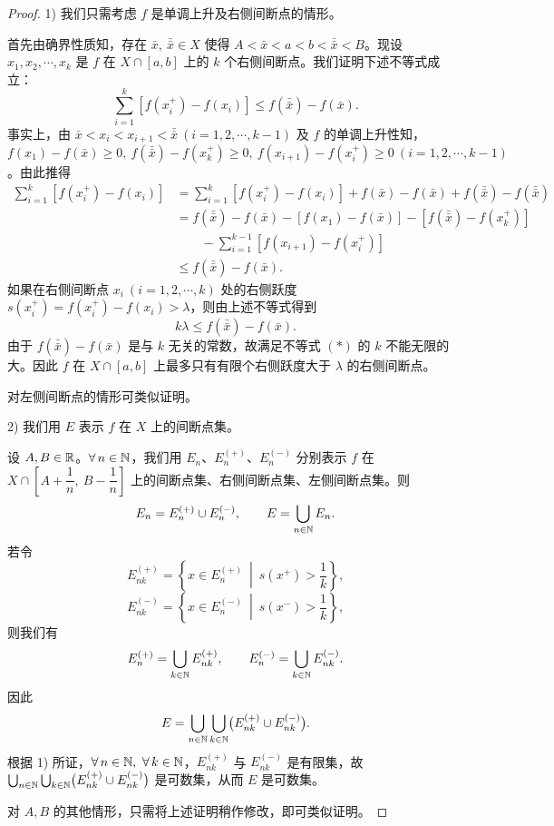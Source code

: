 \begin{proof}

	1) 我们只需考虑 \(f\) 是单调上升及右侧间断点的情形。

	首先由确界性质知，存在 \(\bar x,\ \bar{\bar x}\in X\) 使得 \(A<\bar x<a<b<\bar{\bar x}<B\)。现设 \(x_1,x_2,\cdots,x_k\) 是 \(f\) 在 \(X\cap[a,b]\) 上的 \(k\) 个右侧间断点。我们证明下述不等式成立：
	\[
	\sum_{i=1}^k[f(x_i^+)-f(x_i)]\le f(\bar{\bar x})-f(\bar x).
	\]
	事实上，由 \(\bar x<x_i<x_{i+1}<\bar{\bar x}\ (i=1,2,\cdots,k-1)\) 及 \(f\) 的单调上升性知，\(f(x_1)-f(\bar x)\ge0,\ f(\bar{\bar x})-f(x_k^+)\ge0,\ f(x_{i+1})-f(x_i^+)\ge0\ (i=1,2,\cdots,k-1)\)。由此推得
	\[
	\begin{aligned}
	\sum_{i=1}^k[f(x_i^+)-f(x_i)]
	&=\sum_{i=1}^k[f(x_i^+)-f(x_i)]+f(\bar x)-f(\bar x)+f(\bar{\bar x})-f(\bar{\bar x})\\
	&=f(\bar{\bar x})-f(\bar x)-[f(x_1)-f(\bar x)]-[f(\bar{\bar x})-f(x_k^+)]\\
	&\qquad-\sum_{i=1}^{k-1}[f(x_{i+1})-f(x_i^+)]\\
	&\le f(\bar{\bar x})-f(\bar x).
	\end{aligned}
	\]
	如果在右侧间断点 \(x_i\ (i=1,2,\cdots,k)\) 处的右侧跃度 \(s(x_i^+)=f(x_i^+)-f(x_i)>\lambda\)，则由上述不等式得到
	\[
	k\lambda\le f(\bar{\bar x})-f(\bar x). \tag{*}
	\]
	由于 \(f(\bar{\bar x})-f(\bar x)\) 是与 \(k\) 无关的常数，故满足不等式 \((*)\) 的 \(k\) 不能无限的大。因此 \(f\) 在 \(X\cap[a,b]\) 上最多只有有限个右侧跃度大于 \(\lambda\) 的右侧间断点。

	对左侧间断点的情形可类似证明。

	2) 我们用 \(E\) 表示 \(f\) 在 \(X\) 上的间断点集。

	设 \(A,B\in\mathbb{R}\)。\(\forall\,n\in\mathbb{N}\)，我们用 \(E_n\)、\(E_n^{(+)}\)、\(E_n^{(-)}\) 分别表示 \(f\) 在 \(X\cap\left[A+\dfrac1n,\ B-\dfrac1n\right]\) 上的间断点集、右侧间断点集、左侧间断点集。则
	\[
	E_n=E_n^{(+)}\cup E_n^{(-)},\qquad E=\bigcup_{n\in\mathbb{N}}E_n.
	\]
	若令
	\[
	E_{nk}^{(+)}=\left\{x\in E_n^{(+)}\ \middle|\ s(x^+)>\frac1k\right\},
	\]
	\[
	E_{nk}^{(-)}=\left\{x\in E_n^{(-)}\ \middle|\ s(x^-)>\frac1k\right\},
	\]
	则我们有
	\[
	E_n^{(+)}=\bigcup_{k\in\mathbb{N}}E_{nk}^{(+)},\qquad E_n^{(-)}=\bigcup_{k\in\mathbb{N}}E_{nk}^{(-)}.
	\]
	因此
	\[
	E=\bigcup_{n\in\mathbb{N}}\bigcup_{k\in\mathbb{N}}\bigl(E_{nk}^{(+)}\cup E_{nk}^{(-)}\bigr).
	\]
	根据 1) 所证，\(\forall\,n\in\N,\ \forall\,k\in\N\)，\(E_{nk}^{(+)}\) 与 \(E_{nk}^{(-)}\) 是有限集，故 \(\bigcup_{n\in\mathbb{N}}\bigcup_{k\in\mathbb{N}}\bigl(E_{nk}^{(+)}\cup E_{nk}^{(-)}\bigr)\) 是可数集，从而 \(E\) 是可数集。

	对 \(A,B\) 的其他情形，只需将上述证明稍作修改，即可类似证明。

\end{proof}

